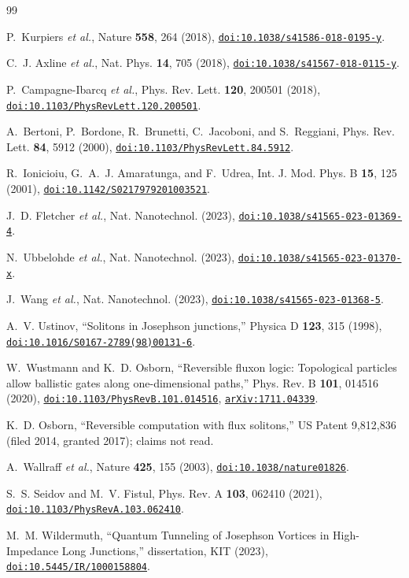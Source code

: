 \documentclass[10pt,twocolumn,letterpaper]{article}
\newcommand{\doi}[1]{\href{https://doi.org/#1}{\nolinkurl{doi:#1}}}
\newcommand{\arxiv}[1]{\href{https://arxiv.org/abs/#1}{\nolinkurl{arXiv:#1}}}
\begin{document}
\begin{thebibliography}{99}

P.~Kurpiers \emph{et al.}, Nature \textbf{558}, 264 (2018), \doi{10.1038/s41586-018-0195-y}.

C.~J. Axline \emph{et al.}, Nat. Phys. \textbf{14}, 705 (2018), \doi{10.1038/s41567-018-0115-y}.

P.~Campagne-Ibarcq \emph{et al.}, Phys. Rev. Lett. \textbf{120}, 200501 (2018), \doi{10.1103/PhysRevLett.120.200501}.

A.~Bertoni, P.~Bordone, R.~Brunetti, C.~Jacoboni, and S.~Reggiani, Phys. Rev. Lett. \textbf{84}, 5912 (2000),
\doi{10.1103/PhysRevLett.84.5912}.

R.~Ionicioiu, G.~A.~J. Amaratunga, and F.~Udrea, Int. J. Mod. Phys. B \textbf{15}, 125 (2001),
\doi{10.1142/S0217979201003521}.

J.~D. Fletcher \emph{et al.}, Nat. Nanotechnol. (2023), \doi{10.1038/s41565-023-01369-4}.

N.~Ubbelohde \emph{et al.}, Nat. Nanotechnol. (2023), \doi{10.1038/s41565-023-01370-x}.

J.~Wang \emph{et al.}, Nat. Nanotechnol. (2023), \doi{10.1038/s41565-023-01368-5}.

A.~V. Ustinov, ``Solitons in Josephson junctions,'' Physica D \textbf{123}, 315 (1998),
\doi{10.1016/S0167-2789(98)00131-6}.

W.~Wustmann and K.~D. Osborn, ``Reversible fluxon logic: Topological particles allow ballistic gates along
one-dimensional paths,'' Phys. Rev. B \textbf{101}, 014516 (2020), \doi{10.1103/PhysRevB.101.014516},
\arxiv{1711.04339}.

K.~D. Osborn, ``Reversible computation with flux solitons,'' US Patent 9,812,836 (filed 2014, granted 2017); claims
not read.

A.~Wallraff \emph{et al.}, Nature \textbf{425}, 155 (2003), \doi{10.1038/nature01826}.

S.~S. Seidov and M.~V. Fistul, Phys. Rev. A \textbf{103}, 062410 (2021), \doi{10.1103/PhysRevA.103.062410}.

M.~M. Wildermuth, ``Quantum Tunneling of Josephson Vortices in High-Impedance Long Junctions,'' dissertation, KIT
(2023), \doi{10.5445/IR/1000158804}.


\end{thebibliography}
\end{document}
